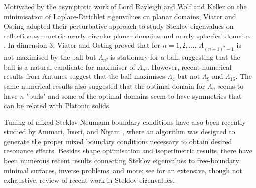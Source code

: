 \documentclass[11pt]{amsart}
\theoremstyle{definition}
\theoremstyle{plain}
\theoremstyle{remark}
\begin{document}
Motivated by the asymptotic work of Lord Rayleigh \cite{Rayleigh} and Wolf and Keller \cite{wolf1994} on the minimisation of Laplace-Dirichlet eigenvalues on planar domains, Viator and Osting adopted  their perturbative approach to study Steklov eigenvalues on reflection-symmetric nearly circular planar domains \cite{viator2018} and nearly spherical domains \cite{viator2022}. In dimension 3, Viator and Osting \cite[Theorem 1.1]{viator2022} proved that for $n = 1, 2, \dots$, $\Lambda_{(n + 1)^2 - 1}$ is not maximised by the ball but $\Lambda_{n^2}$ is stationary for a ball, suggesting that the ball is a natural candidate for maximiser of $\Lambda_{n^2}$. However, recent numerical results from Antunes \cite{antunes2021} suggest that the ball maximises $\Lambda_4$ but not $\Lambda_9$ and $\Lambda_{16}$. The same numerical results also suggested that the optimal domain for $\Lambda_n$ seems to have $n$ "buds" and some of the optimal domains seem to have symmetries that can be related with Platonic solids. 

Tuning of mixed Steklov-Neumann boundary conditions have also been recently studied by Ammari, Imeri, and Nigam \cite{ammari2020}, where an algorithm was designed to generate the proper mixed boundary conditions necessary to obtain desired resonance effects. Besides shape optimisation and isoperimetric results, there have been numerous recent results connecting Steklov eigenvalues to free-boundary minimal surfaces, inverse problems, and more; see \cite{colbois2023} for an extensive, though not exhaustive, review of recent work in Steklov eigenvalues. 
\end{document}
